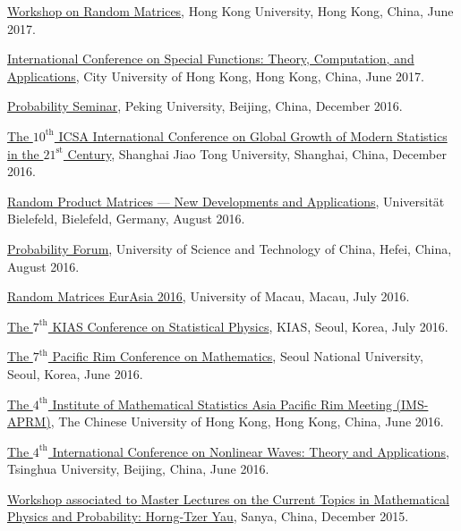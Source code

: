 \begin{item_list}
\item
  \href{http://hkumath.hku.hk/~imr/records1617/Workshop%20on%20Random%20Matrices_2017Jun16.pdf}{Workshop on Random Matrices}, Hong Kong University, Hong Kong, China, June 2017.
\item 
  \href{http://www6.cityu.edu.hk/rcms/icsf2017/index.htm}{International Conference on Special Functions: Theory, Computation, and Applications}, City University of Hong Kong, Hong Kong, China, June 2017.
\item
  \href{http://www.math.pku.edu.cn/teachers/liuyong/seminar/wangdong2016.pdf}{Probability Seminar}, Peking University, Beijing, China, December 2016.
\item
  \href{http://www.math.sjtu.edu.cn/conference/2016icsa/}{The $10^{\text{th}}$ ICSA International Conference on Global Growth of Modern Statistics in the $21^{\text{st}}$ Century}, Shanghai Jiao Tong University, Shanghai, China, December 2016.
\item
  \href{https://www2.physik.uni-bielefeld.de/rpm_2016.html}{Random Product Matrices --- New Developments and Applications}, Universit\"{a}t Bielefeld, Bielefeld, Germany, August 2016.
\item
  \href{http://home.ustc.edu.cn/~shanamy3/index.html}{Probability Forum}, University of Science and Technology of China, Hefei, China, August 2016.
\item
  \href{http://www.fst.umac.mo/conference/RandomMatricesEurAsia2016/Abstracts/Blower_abstract.pdf}{Random Matrices EurAsia 2016}, University of Macau, Macau, July 2016.
\item 
  \href{http://home.kias.re.kr/psec/nspcs16/}{The $7^{\text{th}}$ KIAS Conference on Statistical Physics}, KIAS, Seoul, Korea, July 2016.
\item
  \href{http://prcm.math.snu.ac.kr/}{The $7^{\text{th}}$ Pacific Rim Conference on Mathematics}, Seoul National University, Seoul, Korea, June 2016.
\item
  \href{http://ims-aprm2016.sta.cuhk.edu.hk/}{The $4^{\text{th}}$ Institute of Mathematical Statistics Asia Pacific Rim Meeting (IMS-APRM)}, The Chinese University of Hong Kong, Hong Kong, China, June 2016.
\item
  \href{http://icnwta4.csp.escience.cn/dct/page/1}{The $4^{\text{th}}$ International Conference on Nonlinear Waves: Theory and Applications}, Tsinghua University, Beijing, China, June 2016.
\item
  \href{http://ymsc.tsinghua.edu.cn/sanya/2016/MHTY2016/synopsis_and_organizers.aspx}{Workshop associated to Master Lectures on the Current Topics in Mathematical Physics and Probability: Horng-Tzer Yau}, Sanya, China, December 2015.

\end{item_list}
